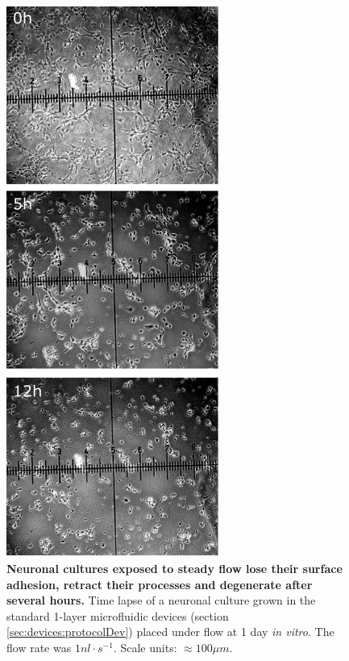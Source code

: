     \begin{figure}[!htb]
            \centering
            \includegraphics[width=7cm]{chapter4/figures/degenerationExample/degenerationExample.jpg}
            \caption[Time lapse of neuronal culture under steady microfluidic flow]{\textbf{Neuronal cultures exposed to steady flow lose their surface adhesion, retract their processes and degenerate after several hours.} Time lapse of a neuronal culture grown in the standard 1-layer microfluidic devices (section \ref{sec:devices:protocolDev}) placed under flow at 1 day \textit{in vitro}. The flow rate was \(1 nl\cdot s^{-1}\). Scale units: \(\approx100 \mu m\).}
            \label{fig:devices:degeneration}
    \end{figure}

